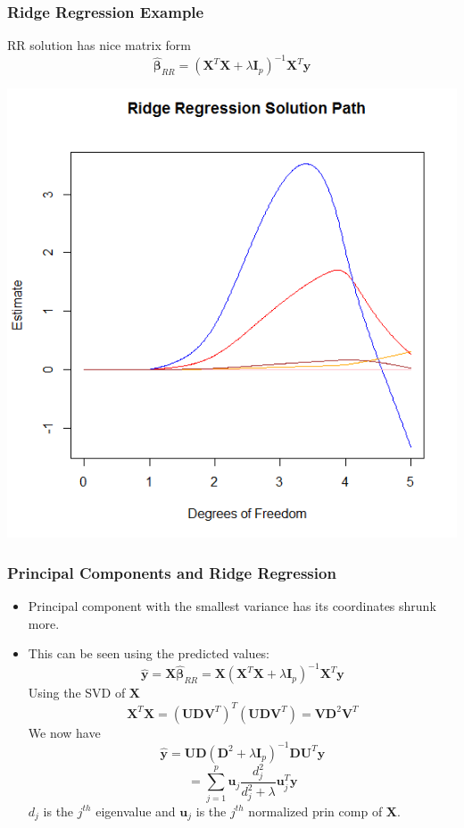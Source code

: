 \documentclass[hide notes,red,handout]{beamer}
\begin{document}
\begin{frame}[t]
\frametitle{Ridge Regression Example}
RR solution has nice matrix form
$$\hat{\boldsymbol{\beta}}_{RR}=(\boldsymbol{X}^{T}\boldsymbol{X}+\lambda \boldsymbol{I}_{p})^{-1}\boldsymbol{X}^{T}\boldsymbol{y}$$
\begin{center}
\includegraphics[scale=0.4]{rrpath}
\end{center}
\end{frame}



\begin{frame}[t]
\frametitle{Principal Components and Ridge Regression}
\begin{itemize}
\item Principal component with the smallest variance has its coordinates shrunk more.	\pause
\item This can be seen using the predicted values:
$$\hat{\boldsymbol{y}}=\boldsymbol{X}\hat{\boldsymbol{\beta}}_{RR} = \boldsymbol{X}(\boldsymbol{X}^{T}\boldsymbol{X}+\lambda \boldsymbol{I}_{p})^{-1}\boldsymbol{X}^{T}\boldsymbol{y}$$
Using the SVD of $\boldsymbol{X}$
$$\boldsymbol{X}^{T}\boldsymbol{X}=(\boldsymbol{U}\boldsymbol{D}\boldsymbol{V}^{T})^{T}(\boldsymbol{U}\boldsymbol{D}\boldsymbol{V}^{T})=\boldsymbol{V}\boldsymbol{D}^2\boldsymbol{V}^{T}$$\pause
We now have
$$\hat{\boldsymbol{y}}=\boldsymbol{U}\boldsymbol{D}(\boldsymbol{D}^2+\lambda\boldsymbol{I}_p)^{-1}\boldsymbol{D}\boldsymbol{U}^{T}\boldsymbol{y}$$
$$=\sum_{j=1}^{p}\boldsymbol{u}_j\frac{d_j^2}{d_j^2+\lambda}\boldsymbol{u}_{j}^{T}\boldsymbol{y}$$
$d_j$ is the $j^{th}$ eigenvalue and $\boldsymbol{u}_{j}$ is the $j^{th}$ normalized prin comp of $\boldsymbol{X}$.
\end{itemize}
\end{frame}
\end{document}
